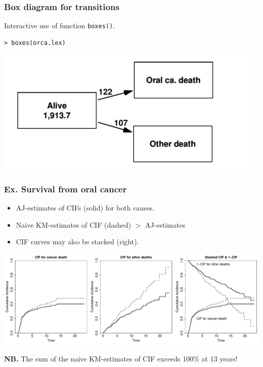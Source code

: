 \documentclass[handout,12pt,dvipsnames,t]{beamer}
\begin{document}
\begin{frame}[fragile]
\frametitle{Box diagram for transitions}

Interactive use of function {\tt boxes()}.
\small
\begin{verbatim}
> boxes(orca.lex)
\end{verbatim}
\begin{center}
\includegraphics[height=6cm]{orca-boxes}
\end{center}
\normalsize

\end{frame}

\begin{frame}[fragile]
\frametitle{Ex. Survival from oral cancer}
\begin{itemize}
\item
AJ-estimates of CIFs (solid) for both causes.
\item
Naive KM-estimates of CIF (dashed) $>$ AJ-estimates 
\item
CIF curves may also be stacked (right).  
\end{itemize}
\includegraphics[width=\textwidth]{orcaCI1}

\textbf{NB.} The sum of the naive KM-estimates of CIF exceeds 100\% at 13 years! 
\end{frame}
\end{document}
